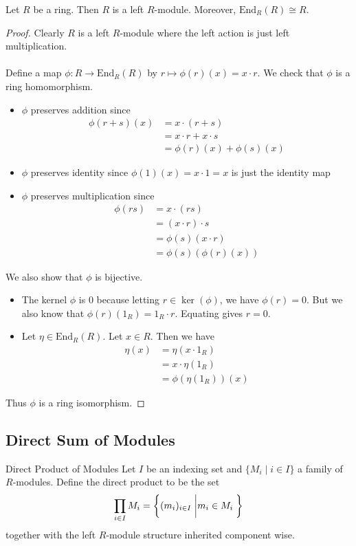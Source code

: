 \documentclass[a4paper]{article}
\begin{document}
\begin{lmm}{}{} Let $R$ be a ring. Then $R$ is a left $R$-module. Moreover, $\text{End}_R(R)\cong R$. \tcbline
\begin{proof}
Clearly $R$ is a left $R$-module where the left action is just left multiplication. \\~\\ Define a map $\phi:R\to\text{End}_R(R)$ by $r\mapsto\phi(r)(x)=x\cdot r$. We check that $\phi$ is a ring homomorphism. 
\begin{itemize}
\item $\phi$ preserves addition since 
\begin{align*}
\phi(r+s)(x)&=x\cdot (r+s)\\
&=x\cdot r+x\cdot s\\
&=\phi(r)(x)+\phi(s)(x)
\end{align*}
\item $\phi$ preserves identity since $\phi(1)(x)=x\cdot 1=x$ is just the identity map
\item $\phi$ preserves multiplication since 
\begin{align*}
\phi(rs)&=x\cdot (rs)\\
&=(x\cdot r)\cdot s\\
&=\phi(s)(x\cdot r)\\
&=\phi(s)(\phi(r)(x))
\end{align*}
\end{itemize}
We also show that $\phi$ is bijective. 
\begin{itemize}
\item The kernel $\phi$ is $0$ because letting $r\in\ker(\phi)$, we have $\phi(r)=0$. But we also know that $\phi(r)(1_R)=1_R\cdot r$. Equating gives $r=0$. 
\item Let $\eta\in\text{End}_R(R)$. Let $x\in R$. Then we have 
\begin{align*}
\eta(x)&=\eta(x\cdot 1_R)\\
&=x\cdot\eta(1_R)\tag{$\eta$ is a module homomorphism}\\
&=\phi(\eta(1_R))(x)
\end{align*}
\end{itemize}
Thus $\phi$ is a ring isomorphism. 
\end{proof}
\end{lmm}

\subsection{Direct Sum of Modules}
\begin{defn}{Direct Product of Modules}{} Let $I$ be an indexing set and $\{M_i\;|\;i\in I\}$ a family of $R$-modules. Define the direct product to be the set $$\prod_{i\in I}M_i=\left\{(m_i)_{i\in I}\;\bigg{|}m_i\in M_i\;\right\}$$ together with the left $R$-module structure inherited component wise. 
\end{defn}
\end{document}

